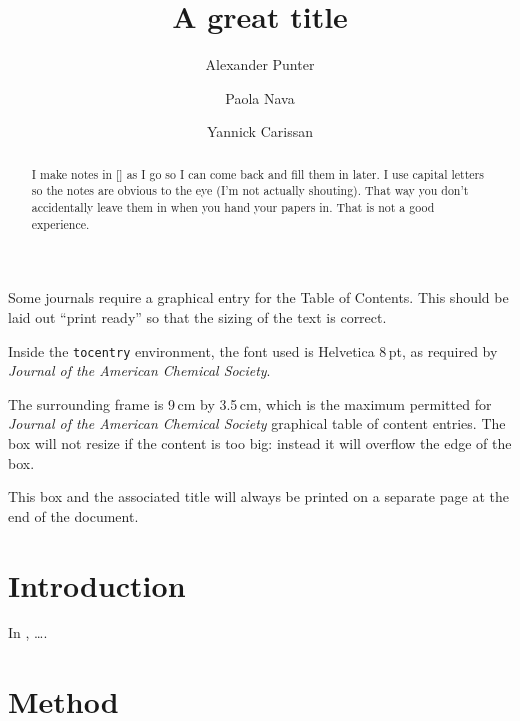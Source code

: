 \documentclass[journal=jctcce,manuscript=article]{achemso}
\author{Alexander Punter}
\author{Paola Nava}
\author{Yannick Carissan}
\affiliation[Aix-Marseille University]
{Aix Marseille Univ, CNRS, Centrale Marseille, iSm2, Marseille, France}
\title[A great title]
  {A great title}
\begin{document}
\begin{tocentry}

Some journals require a graphical entry for the Table of Contents.
This should be laid out ``print ready'' so that the sizing of the
text is correct.

Inside the \texttt{tocentry} environment, the font used is Helvetica
8\,pt, as required by \emph{Journal of the American Chemical
Society}.

The surrounding frame is 9\,cm by 3.5\,cm, which is the maximum
permitted for  \emph{Journal of the American Chemical Society}
graphical table of content entries. The box will not resize if the
content is too big: instead it will overflow the edge of the box.

This box and the associated title will always be printed on a
separate page at the end of the document.

\end{tocentry}

\begin{abstract}
I make notes in [] as I go so I can come back and fill them in later. I use capital letters so the notes are obvious to the eye (I'm not actually shouting). That way you don't accidentally leave them in when you hand your papers in. That is not a good experience.
\end{abstract}

\section{Introduction}

In \cite{Drujon2013}, \ldots .

\section{Method}
\end{document}
